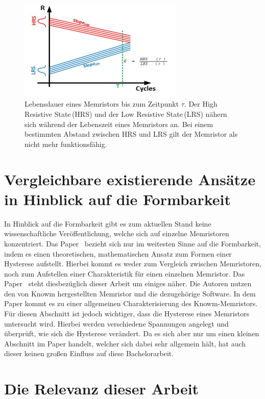 \begin{figure}
  \centering
    \includegraphics[width=0.7\textwidth]{images/Lebensdauer_Graph.jpg}
  \caption{Lebensdauer eines Memristors bis zum Zeitpunkt $\tau$. Der \glqq High Resistive State\grqq\,(HRS) und der \glqq Low Resistive State\grqq\,(LRS) nähern sich während der Lebenszeit eines Memristors an. Bei einem bestimmten Abstand zwischen HRS und LRS gilt der Memristor als nicht mehr funktionsfähig.}
  \label{fig:lebensdauer}
\end{figure}

\section{Vergleichbare existierende Ansätze in Hinblick auf die Formbarkeit}
\label{sec:Formbarkeit}

In Hinblick auf die Formbarkeit gibt es zum aktuellen Stand keine wissenschaftliche Veröffentlichung, welche sich auf einzelne Memristoren konzentriert. Das Paper~\cite{compact_model} bezieht sich nur im weitesten Sinne auf die Formbarkeit, indem es einen theoretischen, mathematischen Ansatz zum Formen einer Hysterese aufstellt. Hierbei kommt es weder zum Vergleich zwischen Memristoren, noch zum Aufstellen einer Charakteristik für einen einzelnen Memristor. Das Paper~\cite{exploring_mem} steht diesbezüglich dieser Arbeit um einiges näher. Die Autoren nutzen den von Knowm hergestellten Memristor und die dezugehörige Software. In dem Paper kommt es zu einer allgemeinen Charakterisierung des Knowm-Memristors. Für diesen Abschnitt ist jedoch wichtiger, dass die Hysterese eines Memristors untersucht wird. Hierbei werden verschiedene Spannungen angelegt und überprüft, wie sich die Hysterese verändert. Da es sich aber nur um einen kleinen Abschnitt im Paper handelt, welcher sich dabei sehr allgemein hält, hat auch dieser keinen großen Einfluss auf diese Bachelorarbeit.

\section{Die Relevanz dieser Arbeit}

